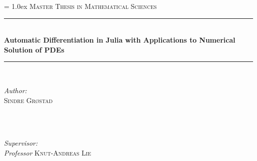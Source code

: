 \begin{titlepage}

\newcommand{\HRule}{\rule{\linewidth}{0.5mm}} %

\center %
 

\parindent=0.0cm
\parskip = 1.0ex
\vspace*{1.5cm}
\textsc{\Large Master Thesis in Mathematical Sciences}\\[0.5cm] %


\HRule \\[0.7cm]
{ \huge \bfseries Automatic Differentiation in Julia with Applications to Numerical Solution of PDEs}\\[0.4cm] %
\HRule \\[1.5cm]
 

\begin{minipage}{0.4\textwidth}
\begin{flushleft} \large
\emph{Author:} \\ 
\textsc{Sindre Grøstad} \\ %
\textsc{ } \\
\end{flushleft}
\end{minipage}
~
\begin{minipage}{0.5\textwidth}
\begin{flushright} \large
\emph{Supervisor:} \\
\emph{Professor} \textsc{Knut-Andreas Lie} \\%
\end{flushright}
\end{minipage}\\[4cm]
\vspace{5cm}


\end{titlepage}
